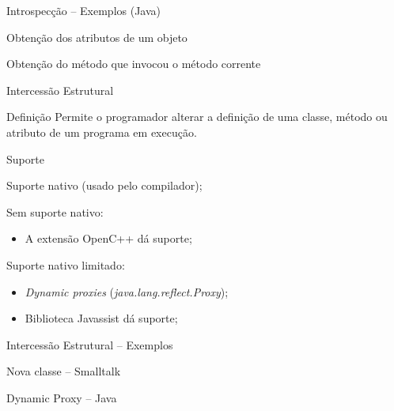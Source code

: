 \documentclass[12pt,t]{beamer}
\begin{document}
 	 \begin{frame}{Introspecção -- Exemplos (Java)}
 	 	\begin{exampleblock}{Obtenção dos atributos de um objeto}
 	 		
 	 	\end{exampleblock}
 	 	\pause
 	 	\begin{exampleblock}{Obtenção do método que invocou o método corrente}
 	 		
 	 	\end{exampleblock}
 	 \end{frame}
 	 \begin{frame}{Intercessão Estrutural}
 	 	\begin{block}{Definição \cite{chiba2000load}}
 	 		Permite o programador alterar a definição de uma classe, método ou atributo de um programa em execução.
 	 	\end{block} 
 	 	\pause
 	 	\begin{block}{Suporte}
 	 		\begin{description}[Smalltalk:]
 	 			\item [Smalltalk:] Suporte nativo (usado pelo compilador);
 	 			\pause
 	 			\item [C++:] Sem suporte nativo:  
 	 				\begin{itemize}
		 	 			\item A extensão OpenC++ \cite{chiba1995metaobject} dá suporte;
		 	 		\end{itemize}
	 	 		\pause
 	 			\item [Java:] Suporte nativo limitado:
	 	 			\begin{itemize}
	 	 				\item \emph{Dynamic proxies} (\emph{java.lang.reflect.Proxy});
	 	 				\item Biblioteca Javassist \cite{chiba2000load} dá suporte;
	 	 			\end{itemize}
 	 		\end{description}
 	 	\end{block}
 	 \end{frame}
 	 \begin{frame}{Intercessão Estrutural -- Exemplos}
 	 	\begin{exampleblock}{Nova classe -- Smalltalk}
 	 		
 	 	\end{exampleblock}
 	 	\pause
 	 	\begin{exampleblock}{Dynamic Proxy -- Java}
 	 		
 	 	\end{exampleblock}
 	 \end{frame}
\end{document}

